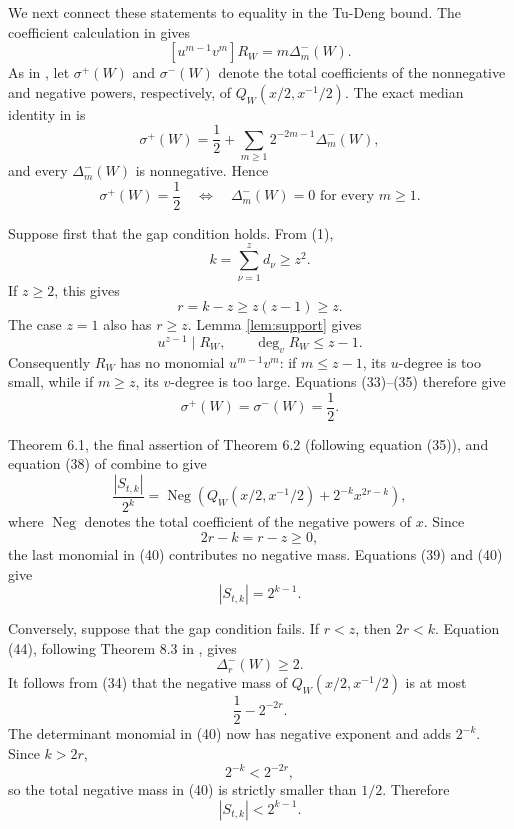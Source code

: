 \documentclass[11pt]{article}
\newcommand{\Neg}{\operatorname{Neg}}
\begin{document}
We next connect these statements to equality in the Tu-Deng bound.
The coefficient calculation in \cite[proof of Theorem 5.2]{Proof} gives
\[
 [u^{m-1}v^m]R_W=m\Delta_m^-(W).                            \tag{33}
\]
As in \cite[equation (39)]{Proof}, let $\sigma^+(W)$ and
$\sigma^-(W)$ denote the total coefficients of the nonnegative and
negative powers, respectively, of $Q_W(x/2,x^{-1}/2)$.  The exact
median identity in \cite[Lemma 8.2, equation (41)]{Proof} is
\[
 \sigma^+(W)=\frac12+
       \sum_{m\geq1}2^{-2m-1}\Delta_m^-(W),                 \tag{34}
\]
and every $\Delta_m^-(W)$ is nonnegative.  Hence
\[
 \sigma^+(W)=\frac12
 \quad\Longleftrightarrow\quad
 \Delta_m^-(W)=0\text{ for every }m\geq1.                  \tag{35}
\]

Suppose first that the gap condition holds.  From (1),
\[
                         k=\sum_{\nu=1}^{z}d_\nu\geq z^2.   \tag{36}
\]
If $z\geq2$, this gives
\[
                         r=k-z\geq z(z-1)\geq z.             \tag{37}
\]
The case $z=1$ also has $r\geq z$.  Lemma \ref{lem:support}
gives
\[
                  u^{z-1}\mid R_W,
                  \qquad \deg_vR_W\leq z-1.                \tag{38}
\]
Consequently $R_W$ has no monomial $u^{m-1}v^m$: if
$m\leq z-1$, its $u$-degree is too small, while if $m\geq z$,
its $v$-degree is too large.  Equations (33)--(35) therefore give
\[
                         \sigma^+(W)=\sigma^-(W)=\frac12.   \tag{39}
\]

Theorem 6.1, the final assertion of Theorem 6.2 (following equation (35)),
and equation (38) of \cite{Proof} combine to give
\[
 \frac{|S_{t,k}|}{2^k}
 =\Neg\left(
       Q_W(x/2,x^{-1}/2)+2^{-k}x^{2r-k}
           \right),                                        \tag{40}
\]
where $\Neg$ denotes the total coefficient of the negative powers of
$x$.  Since
\[
                         2r-k=r-z\geq0,                     \tag{41}
\]
the last monomial in (40) contributes no negative mass.  Equations
(39) and (40) give
\[
                         |S_{t,k}|=2^{k-1}.                  \tag{42}
\]

Conversely, suppose that the gap condition fails.  If $r<z$, then
$2r<k$.  Equation (44), following Theorem 8.3 in \cite{Proof}, gives
\[
                         \Delta_r^-(W)\geq2.                 \tag{43}
\]
It follows from (34) that the negative mass of
$Q_W(x/2,x^{-1}/2)$ is at most
\[
                         \frac12-2^{-2r}.
\]
The determinant monomial in (40) now has negative exponent and adds
$2^{-k}$.  Since $k>2r$,
\[
                         2^{-k}<2^{-2r},
\]
so the total negative mass in (40) is strictly smaller than $1/2$.
Therefore
\[
                         |S_{t,k}|<2^{k-1}.                  \tag{44}
\]
\end{document}
